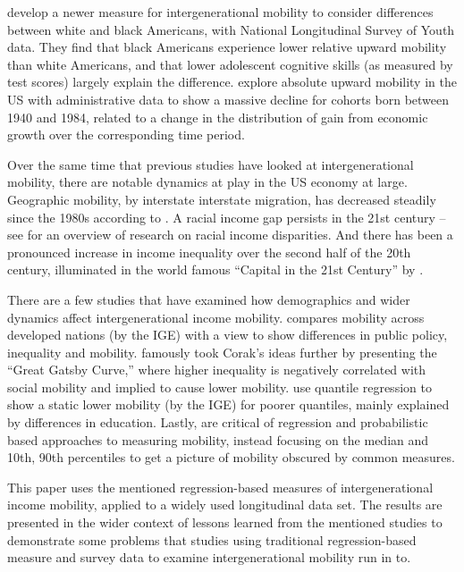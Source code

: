 \documentclass[notitlepage,12pt]{article}
\begin{document}
\cite{bhattacharya2011nonparametric} develop a newer measure for intergenerational mobility to consider differences between white and black Americans, with National Longitudinal Survey of Youth data. They find that black Americans experience lower relative upward mobility than white Americans, and that lower adolescent  cognitive skills (as measured by test scores) largely explain the difference.  \cite{chetty2017fading} explore absolute upward mobility in the US with administrative data to show a massive decline for cohorts born between 1940 and 1984, related to a change in the distribution of gain from economic growth over the corresponding time period.

Over the same time that previous studies have looked at intergenerational mobility, there are notable dynamics at play in the US economy at large.  Geographic mobility, by interstate interstate migration, has decreased steadily since the 1980s according to \cite{NBERw20065}.  A racial income gap persists in the 21st century -- see \cite{reich2017racial} for an overview of research on racial income disparities.  And there has been a pronounced increase in income inequality over the second half of the 20th century, illuminated in the world famous ``Capital in the 21st Century'' by \cite{piketty2017capital}.  

There are a few studies that have examined how demographics and wider dynamics affect intergenerational income mobility.  \cite{corak2013income} compares mobility across developed nations (by the IGE) with a view to show differences in public policy, inequality and mobility.  \cite{krueger2012rise} famously took Corak's ideas further by presenting the ``Great Gatsby Curve,'' where higher inequality is negatively correlated with social mobility and implied to cause lower mobility.  \cite{eide1999factors} use quantile regression to show a static lower mobility (by the IGE) for poorer quantiles, mainly explained by differences in education.  Lastly, \cite{nichols2009detailed} are critical of regression and probabilistic based approaches to measuring mobility, instead focusing on the median and 10th, 90th percentiles to get a picture of mobility obscured by common measures.

This paper uses the mentioned regression-based measures of intergenerational income mobility, applied to a widely used longitudinal data set.  The results are presented in the wider context of lessons learned from the mentioned studies to demonstrate some problems that studies using traditional regression-based measure and survey data to examine intergenerational mobility run in to.
\end{document}
